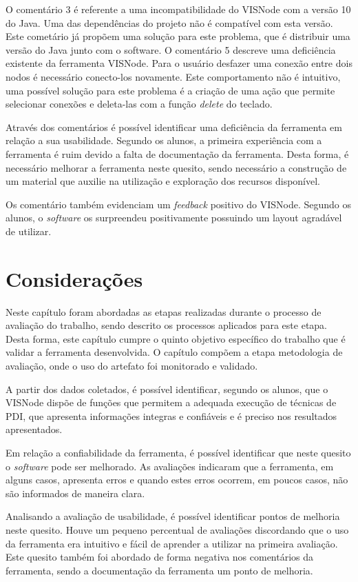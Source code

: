 \documentclass[
	12pt,				%
	oneside,			%
	a4paper,			%
	english,			%
	french,				%
	spanish,			%
	brazil,				%
	]{abntex2}
\begin{document}
O comentário 3 é referente a uma incompatibilidade do VISNode com a versão 10 do Java. Uma das dependências do projeto não é compatível com esta versão. Este cometário já propõem uma solução para este problema, que é distribuir uma versão do Java junto com o software. 
O comentário 5 descreve uma deficiência existente da ferramenta VISNode. Para o usuário desfazer uma conexão entre dois nodos é necessário conecto-los novamente. Este comportamento não é intuitivo, uma possível solução para este problema é a criação de uma ação que permite selecionar conexões e deleta-las com a função \textit{delete} do teclado.

Através dos comentários é possível identificar uma deficiência da ferramenta em relação a sua usabilidade. Segundo os alunos, a primeira experiência com a ferramenta é ruim devido a falta de documentação da ferramenta. Desta forma, é necessário melhorar a ferramenta neste quesito, sendo necessário a construção de um material que auxilie na utilização e exploração dos recursos disponível.

Os comentário também evidenciam um \textit{feedback} positivo do VISNode. Segundo os alunos, o \textit{software} os surpreendeu positivamente possuindo um layout agradável de utilizar.

\section{Considerações}

Neste capítulo foram abordadas as etapas realizadas durante o processo de avaliação do trabalho, sendo descrito os processos aplicados para este etapa. Desta forma, este capítulo cumpre o quinto objetivo específico do trabalho que é validar a ferramenta desenvolvida. O capítulo compõem a etapa metodologia de avaliação, onde o uso do artefato foi monitorado e validado.

A partir dos dados coletados, é possível identificar, segundo os alunos, que o VISNode dispõe de funções que permitem a adequada execução de técnicas de PDI,
que apresenta informações integras e confiáveis e é preciso nos resultados apresentados.

Em relação a confiabilidade da ferramenta, é possível identificar que neste quesito o \textit{software} pode ser melhorado. As avaliações indicaram que a ferramenta, em alguns casos, apresenta erros e quando estes erros ocorrem, em poucos casos, não são informados de maneira clara.

Analisando a avaliação de usabilidade, é possível identificar pontos de melhoria neste quesito. Houve um pequeno percentual de avaliações discordando que o uso da ferramenta era intuitivo e fácil de aprender a utilizar na primeira avaliação. Este quesito também foi abordado de forma negativa nos comentários da ferramenta, sendo a documentação da ferramenta um ponto de melhoria.
\end{document}
